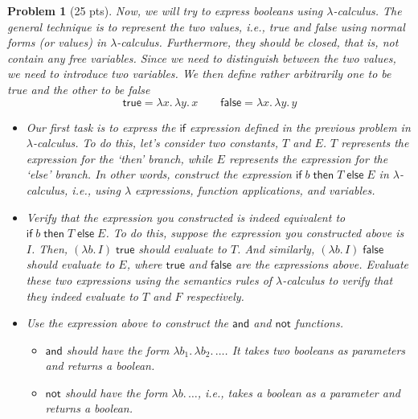 \documentclass{article}
\newcommand{\lc}{$\lambda$-calculus}
\newcommand{\m}[1]{\mathsf{#1}}
\newcommand{\elam}[2]{\lambda{#1}.\,{#2}}
\newcommand{\eapp}[2]{#1 \; #2}
\newcommand{\eif}[3]{\m{if} \; #1 \; \m{then} \; #2 \; \m{else} \; #3}
\newtheorem{problem}{Problem}
\begin{document}
\begin{problem}[25 pts]
    Now, we will try to express booleans using \lc{}. The general technique is to represent the two values, i.e., true and false using
    normal forms (or values) in \lc{}. Furthermore, they should be closed, that is, not contain any free variables. Since we need to
    distinguish between the two values, we need to introduce two variables.
    We then define rather arbitrarily one to be true and the other to be false
    \[
        \m{true} = \elam{x}{\elam{y}{x}} \qquad
        \m{false} = \elam{x}{\elam{y}{y}}
    \]

    \begin{itemize}
        \item[(10 pts)] Our first task is to express the $\m{if}$ expression defined in the previous problem in \lc{}. To do this,
        let's consider two constants, $T$ and $E$. $T$ represents the expression for the `then' branch, while $E$ represents the
        expression for the `else' branch. In other words, construct the expression $\eif{b}{T}{E}$ in \lc{}, i.e., using $\lambda$
        expressions, function applications, and variables.

        \item[(5 pts)] Verify that the expression you constructed is indeed equivalent to $\eif{b}{T}{E}$. To do this, suppose the
        expression you constructed above is $I$. Then, $\eapp{(\elam{b}{I})}{\m{true}}$ should evaluate to $T$.
        And similarly, $\eapp{(\elam{b}{I})}{\m{false}}$ should evaluate to $E$, where $\m{true}$ and $\m{false}$ are the expressions
        above. Evaluate these two expressions using the semantics rules of \lc{} to verify that they indeed evaluate to $T$ and $F$
        respectively.
        
        \item[(10 pts)] Use the expression above to construct the $\m{and}$ and $\m{not}$ functions.
        \begin{itemize}
            \item $\m{and}$ should have the form $\elam{b_1}{\elam{b_2}{\ldots}}$. It takes two booleans as parameters and returns
            a boolean.
            \item $\m{not}$ should have the form $\elam{b}{\ldots}$, i.e., takes a boolean as a parameter and returns a boolean.
        \end{itemize}
    \end{itemize}
\end{problem}
\end{document}
